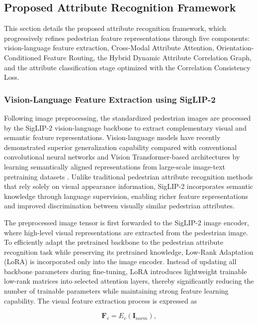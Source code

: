\documentclass{ieeeaccess}
\begin{document}
\subsection{Proposed Attribute Recognition Framework}\label{subsec:framework}

This section details the proposed attribute recognition framework, which progressively refines pedestrian feature representations through five components: vision-language feature extraction, Cross-Modal Attribute Attention, Orientation-Conditioned Feature Routing, the Hybrid Dynamic Attribute Correlation Graph, and the attribute classification stage optimized with the Correlation Consistency Loss.

\subsubsection{Vision-Language Feature Extraction using SigLIP-2}

Following image preprocessing, the standardized pedestrian images are processed by the SigLIP-2 vision-language backbone to extract complementary visual and semantic feature representations. Vision-language models have recently demonstrated superior generalization capability compared with conventional convolutional neural networks and Vision Transformer-based architectures by learning semantically aligned representations from large-scale image-text pretraining datasets \cite{bib6,bib7,bib11}. Unlike traditional pedestrian attribute recognition methods that rely solely on visual appearance information, SigLIP-2 incorporates semantic knowledge through language supervision, enabling richer feature representations and improved discrimination between visually similar pedestrian attributes.

The preprocessed image tensor is first forwarded to the SigLIP-2 image encoder, where high-level visual representations are extracted from the pedestrian image. To efficiently adapt the pretrained backbone to the pedestrian attribute recognition task while preserving its pretrained knowledge, Low-Rank Adaptation (LoRA) is incorporated only into the image encoder. Instead of updating all backbone parameters during fine-tuning, LoRA introduces lightweight trainable low-rank matrices into selected attention layers, thereby significantly reducing the number of trainable parameters while maintaining strong feature learning capability. The visual feature extraction process is expressed as

\begin{equation}
\mathbf{F}_{v}=E_{v}(\mathbf{I}_{norm}),
\label{eq:visual_features}
\end{equation}
\end{document}
